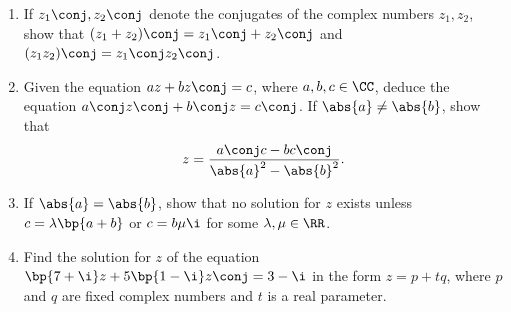 \clearpage
\begin{problem}
    \begin{enumerate}
        \item If $z_1\conj, z_2\conj$ denote the conjugates of the complex numbers $z_1, z_2$, show that $(z_1 + z_2)\conj = z_1\conj + z_2\conj$ and $(z_1z_2)\conj = z_1\conj z_2\conj$.
        \item Given the equation $az + bz\conj = c$, where $a, b , c \in \CC$, deduce the equation $a\conj z\conj + b\conj z = c\conj$. If $\abs{a} \neq \abs{b}$, show that \[z = \frac{a\conj c - b c\conj}{\abs{a}^2 - \abs{b}^2}.\]
        \item If $\abs{a} = \abs{b}$, show that no solution for $z$ exists unless $c = \l\bp{a + b}$ or $c = b \m \i$ for some $\l, \m \in \RR$.
        \item Find the solution for $z$ of the equation $\bp{7 + \i} z + 5\bp{1 - \i} z\conj = 3 - \i$ in the form $z = p + tq$, where $p$ and $q$ are fixed complex numbers and $t$ is a real parameter.
    \end{enumerate}
\end{problem}
